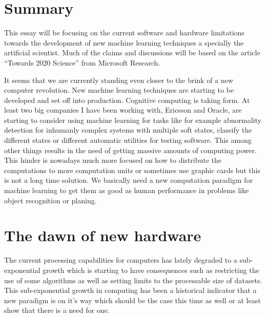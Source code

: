 \documentclass{article}
\begin{document}

\section{Summary}
    This essay will be focusing on the current software and hardware limitations
    towards the development of new machine learning techniques a specially the
    artificial scientist. Much of the claims and discussions will be based on
    the article ``Towards 2020 Science'' from Microsoft Research.\cite{ms2020}

    It seems that we are currently standing even closer to the brink of a new 
    computer revolution. New machine learning techniques are starting to be 
    developed and set off into production. Cognitive computing is taking form.
    At least two big companies I have 
    been working with, Ericsson and Oracle, are starting to consider using 
    machine learning for tasks like for example abnormality detection for 
    inhumanly complex systems with multiple soft
    states, classify the different states or different automatic utilities for
    testing software. This among other things results in
    the need of getting massive amounts of computing power.
    This hinder is nowadays much more focused on how to 
    distribute the computations to more computation units or sometimes use
    graphic cards but this is not a long time solution. We basically need a new
    computation paradigm for machine learning to get them as good as human
    performance in problems like object recognition or planing.



\section{The dawn of new hardware}
    The current processing capabilities for computers has lately degraded to a
    sub-exponential growth which is starting to have consequences such as 
    restricting the use of some algorithms as well as setting limits 
    to the processable size of datasets.
    This sub-exponential growth in computing has been a historical indicator
    that a new paradigm is on it's way which should be the case this time as
    well or at least show that there is a need for one.
    
\end{document}
